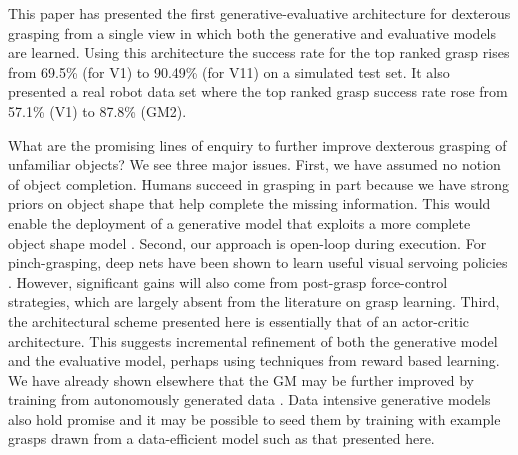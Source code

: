 This paper has presented the first generative-evaluative architecture for dexterous grasping from a single view in which both the generative and evaluative models are learned. Using this architecture the success rate for the top ranked grasp rises from 69.5\% (for V1) to 90.49\% (for V11) on a simulated test set. It also presented a real robot data set where the top ranked grasp success rate rose from 57.1\% (V1) to 87.8\% (GM2).

What are the promising lines of enquiry to further improve dexterous grasping of unfamiliar objects? We see three major issues. First, we have assumed no notion of object completion. Humans succeed in grasping in part because we have strong priors on object shape that help complete the missing information. This would enable the deployment of a generative model that exploits a more complete object shape model \cite{kopicki2015ijrr}. Second, our approach is open-loop during execution. For pinch-grasping, deep nets have been shown to learn useful visual servoing policies \cite{morrison18}. However, significant gains will also come from post-grasp force-control strategies, which are largely absent from the literature on grasp learning.  Third, the architectural scheme presented here is essentially that of an actor-critic architecture. This suggests incremental refinement of both the generative model and the evaluative model, perhaps using techniques from reward based learning. We have already shown elsewhere that the GM may be further improved by training from autonomously generated data \cite{kopicki2019}. Data intensive generative models also hold promise \cite{veres2017modeling} and it may be possible to seed them by training with example grasps drawn from a data-efficient model such as that presented here.